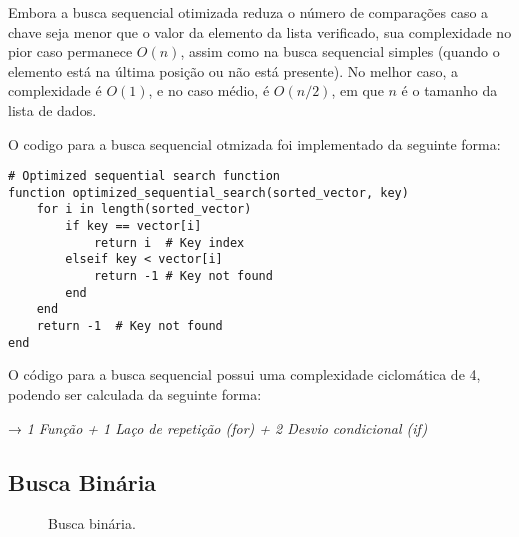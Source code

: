 \documentclass[12pt]{article}
\begin{document}
    Embora a busca sequencial otimizada reduza o número de comparações caso a chave seja menor que o valor da elemento da lista verificado, sua complexidade no pior caso permanece \(O(n)\), assim como na busca sequencial simples (quando o elemento está na última posição ou não está presente). No melhor caso, a complexidade é \(O(1)\), e no caso médio, é \(O(n/2)\), em que \(n\) é o tamanho da lista de dados.

    O codigo para a busca sequencial otmizada foi implementado da seguinte forma:
    \begin{verbatim}
# Optimized sequential search function
function optimized_sequential_search(sorted_vector, key)
    for i in length(sorted_vector)
        if key == vector[i]
            return i  # Key index
        elseif key < vector[i]
            return -1 # Key not found
        end
    end
    return -1  # Key not found
end
    \end{verbatim}

     O código para a busca sequencial possui uma complexidade ciclomática de 4, podendo ser calculada da seguinte forma: 

    \begin{center}
        → \textit{1 Função + 1 Laço de repetição (for) + 2 Desvio condicional (if)}
    \end{center}
    




    
    
\subsection{Busca Binária} 

    \begin{figure}[h]
      \centering
      \caption{Busca binária.}
      \label{fig:busca_binaria}
    \end{figure}
\end{document}
